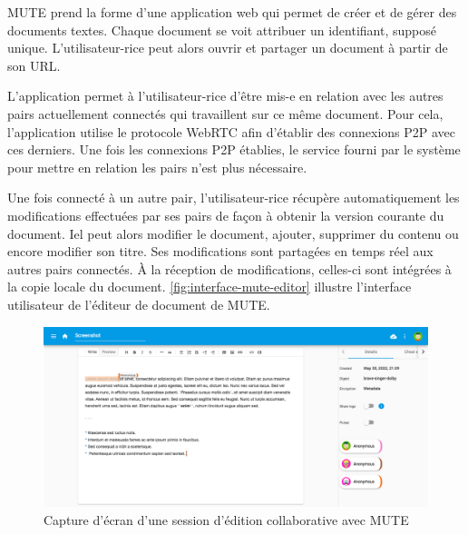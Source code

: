 \ac{MUTE} prend la forme d'une application web qui permet de créer et de gérer des documents textes.
Chaque document se voit attribuer un identifiant, supposé unique.
L'utilisateur-rice peut alors ouvrir et partager un document à partir de son URL.

L'application permet à l'utilisateur-rice d'être mis-e en relation avec les autres pairs actuellement connectés qui travaillent sur ce même document.
Pour cela, l'application utilise le protocole WebRTC afin d'établir des connexions \ac{P2P} avec ces derniers.
Une fois les connexions \ac{P2P} établies, le service fourni par le système pour mettre en relation les pairs n'est plus nécessaire.

Une fois connecté à un autre pair, l'utilisateur-rice récupère automatiquement les modifications effectuées par ses pairs de façon à obtenir la version courante du document.
Iel peut alors modifier le document, \ie ajouter, supprimer du contenu ou encore modifier son titre.
Ses modifications sont partagées en temps réel aux autres pairs connectés.
À la réception de modifications, celles-ci sont intégrées à la copie locale du document.
\autoref{fig:interface-mute-editor} illustre l'interface utilisateur de l'éditeur de document de MUTE.
\begin{figure}[!ht]
    \centering
    \includegraphics[width=\linewidth]{img/screenshot-mute-editor.png}
    \caption{Capture d'écran d'une session d'édition collaborative avec MUTE}
    \label{fig:interface-mute-editor}
\end{figure}

